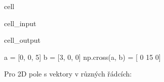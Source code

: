 \documentclass[letterpaper,10pt,english]{jupyterBook}
\begin{document}
\begin{sphinxuseclass}{cell}\begin{sphinxVerbatimInput}

\begin{sphinxuseclass}{cell_input}
\begin{sphinxVerbatim}[commandchars=\\\{\}]
  \PYG{p}{[}  \PYG{p}{]}
  \PYG{p}{[}  \PYG{p}{]}

   
  
\end{sphinxVerbatim}

\end{sphinxuseclass}\end{sphinxVerbatimInput}
\begin{sphinxVerbatimOutput}

\begin{sphinxuseclass}{cell_output}
\begin{sphinxVerbatim}[commandchars=\\\{\}]
a = [0, 0, 5] 
 b = [3, 0, 0]
np.cross(a, b) = [ 0 15  0]
\end{sphinxVerbatim}

\end{sphinxuseclass}\end{sphinxVerbatimOutput}

\end{sphinxuseclass}
\sphinxAtStartPar
Pro 2D pole s vektory v různých řádcích:
\end{document}
